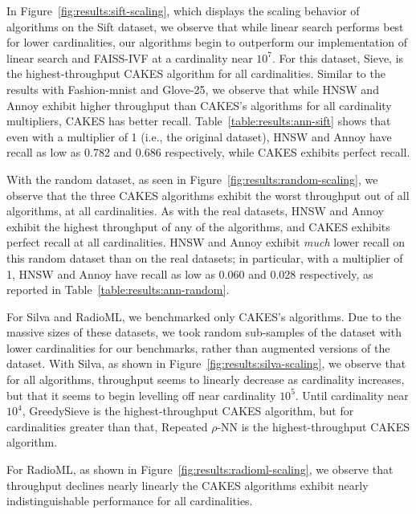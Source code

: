 In Figure~\ref{fig:results:sift-scaling}, which displays the scaling behavior of algorithms on the Sift dataset, we observe that while linear search performs best for lower cardinalities, our algorithms begin to outperform our implementation of linear search and FAISS-IVF at a cardinality near $10^7$.
For this dataset, Sieve, is the highest-throughput CAKES algorithm for all cardinalities.
Similar to the results with Fashion-mnist and Glove-25, we observe that while HNSW and Annoy exhibit higher throughput than CAKES's algorithms for all cardinality multipliers, CAKES has better recall.
Table~\ref{table:results:ann-sift} shows that even with a multiplier of 1 (i.e., the original dataset), HNSW and Annoy have recall as low as 0.782 and 0.686 respectively, while CAKES exhibits perfect recall.


With the random dataset, as seen in Figure~\ref{fig:results:random-scaling}, we observe that the three CAKES algorithms exhibit the worst throughput out of all algorithms, at all cardinalities. 
As with the real datasets, HNSW and Annoy exhibit the highest throughput of any of the algorithms, and CAKES exhibits perfect recall at all cardinalities. 
HNSW and Annoy exhibit \emph{much} lower recall on this random dataset than on the real datasets; 
in particular, with a multiplier of 1, HNSW and Annoy have recall as low as 0.060 and 0.028 respectively, as reported in Table~\ref{table:results:ann-random}.


For Silva and RadioML, we benchmarked only CAKES's algorithms.
Due to the massive sizes of these datasets, we took random sub-samples of the dataset with lower cardinalities for our benchmarks, rather than augmented versions of the dataset.
With Silva, as shown in Figure~\ref{fig:results:silva-scaling}, we observe that for all algorithms, throughput seems to linearly decrease as cardinality increases, but that it seems to begin levelling off near cardinality $10^5$. Until cardinality near $10^4$, GreedySieve is the highest-throughput CAKES algorithm, but for cardinalities greater than that, Repeated $\rho$-NN is the highest-throughput CAKES algorithm. 

For RadioML, as shown in Figure~\ref{fig:results:radioml-scaling}, we observe that throughput declines nearly linearly the CAKES algorithms exhibit nearly indistinguishable performance for all cardinalities. 

